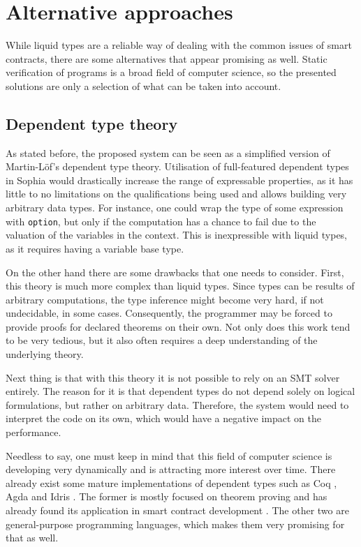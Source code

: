 \section{Alternative approaches}

While liquid types are a reliable way of dealing with the common issues of smart
contracts, there are some alternatives that appear promising as well. Static
verification of programs is a broad field of computer science, so the presented
solutions are only a selection of what can be taken into account.

\subsection{Dependent type theory}

As stated before, the proposed system can be seen as a simplified version of
Martin-Löf's dependent type theory. Utilisation of full-featured dependent types
in Sophia would drastically increase the range of expressable properties, as it
has little to no limitations on the qualifications being used and allows
building very arbitrary data types. For instance, one could wrap the type of
some expression with \texttt{option}, but only if the computation has a chance
to fail due to the valuation of the variables in the context. This is
inexpressible with liquid types, as it requires having a variable base type.

On the other hand there are some drawbacks that one needs to consider. First,
this theory is much more complex than liquid types. Since types can be results
of arbitrary computations, the type inference might become very hard, if not
undecidable, in some cases. Consequently, the programmer may be forced to
provide proofs for declared theorems on their own. Not only does this work tend
to be very tedious, but it also often requires a deep understanding of the
underlying theory.

Next thing is that with this theory it is not possible to rely on an SMT solver
entirely. The reason for it is that dependent types do not depend solely on
logical formulations, but rather on arbitrary data. Therefore, the system would
need to interpret the code on its own, which would have a negative impact on the
performance.

Needless to say, one must keep in mind that this field of computer science is
developing very dynamically and is attracting more interest over time. There
already exist some mature implementations of dependent types such as Coq
\cite{10.5555/993954}, Agda \cite{agda} and Idris \cite{idris}. The former is
mostly focused on theorem proving and has already found its application in smart
contract development \cite{10.1145/3437992.3439934}. The other two are
general-purpose programming languages, which makes them very promising for that
as well.

